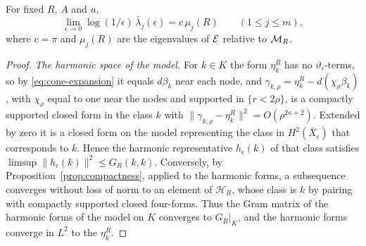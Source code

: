 \begin{theorem}\label{thm:model-law}
For fixed $R$, $A$ and $u$,
\[
 \lim_{\epsilon\to0}\log(1/\epsilon)\,\bar\lambda_j(\epsilon)=c\,\mu_j(R)
 \qquad(1\le j\le m),
\]
where $c=\pi$ and $\mu_j(R)$ are the eigenvalues of $\mathcal E$ relative to
$\mathcal M_R$.
\end{theorem}
\begin{proof}
\emph{The harmonic space of the model.} For $k\in K$ the form $\eta^R_k$
has no $\vartheta_i$-terms, so by \eqref{eq:cone-expansion} it equals
$d\beta_k$ near each node, and
$\gamma_{k,\rho}=\eta^R_k-d(\chi_\rho\beta_k)$, with $\chi_\rho$ equal to
one near the nodes and supported in $\{r<2\rho\}$, is a compactly
supported closed form in the class $k$ with
$\|\gamma_{k,\rho}-\eta^R_k\|^2=O(\rho^{2\kappa+2})$. Extended by zero it
is a closed form on the model representing the class in
$H^2(\overline X_\epsilon)$ that corresponds to $k$. Hence the harmonic
representative $h_\epsilon(k)$ of that class satisfies
$\limsup\|h_\epsilon(k)\|^2\le G_R(k,k)$. Conversely, by
Proposition~\ref{prop:compactness}, applied to the harmonic forms, a
subsequence converges without loss of norm to an element of
$\mathcal H_R$, whose class is $k$ by pairing with compactly supported
closed four-forms. Thus the Gram matrix of the harmonic forms of the
model on $K$ converges to $G_R|_K$, and the harmonic forms converge in
$L^2$ to the $\eta^R_k$.


\end{proof}
